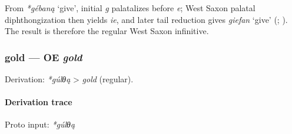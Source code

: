 \documentclass[
  british,
  a4paper,
]{article}
\providecommand{\Recon}[1]{\emph{*#1}}
\begin{document}
From \Recon{gébaną} `give', initial \emph{g} palatalizes before
\emph{e}; West Saxon palatal diphthongization then yields \emph{ie}, and
later tail reduction gives {\emph{giefan}} `give'
(;
). The result is
therefore the regular West Saxon infinitive.

\subsubsection{\texorpdfstring{gold --- OE
\emph{gold}}{gold --- OE gold}}\label{gold-oe-gold}

Derivation: \emph{*gúlθą} \textgreater{} \emph{gold} (regular).

\paragraph{Derivation trace}\label{derivation-trace-33}

Proto input: \emph{*gúlθą}

\begingroup
\setlength{\fboxsep}{6pt}
\end{document}
